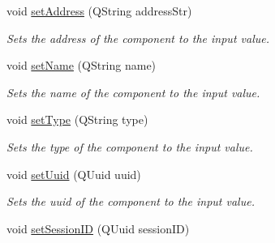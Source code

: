 \begin{DoxyCompactItemize}
\item 
\hypertarget{class_component_info_a73e97f046f6ec80a15ffad25293bd768}{void \hyperlink{class_component_info_a73e97f046f6ec80a15ffad25293bd768}{set\-Address} (Q\-String address\-Str)}\label{class_component_info_a73e97f046f6ec80a15ffad25293bd768}

\begin{DoxyCompactList}\small\item\em Sets the address of the component to the input value. \end{DoxyCompactList}\item 
\hypertarget{class_component_info_a94821c16533f7d2615d03a01164a7238}{void \hyperlink{class_component_info_a94821c16533f7d2615d03a01164a7238}{set\-Name} (Q\-String name)}\label{class_component_info_a94821c16533f7d2615d03a01164a7238}

\begin{DoxyCompactList}\small\item\em Sets the name of the component to the input value. \end{DoxyCompactList}\item 
\hypertarget{class_component_info_a22b8ce5e6bcae5a3c6b40ef9e89bbc62}{void \hyperlink{class_component_info_a22b8ce5e6bcae5a3c6b40ef9e89bbc62}{set\-Type} (Q\-String type)}\label{class_component_info_a22b8ce5e6bcae5a3c6b40ef9e89bbc62}

\begin{DoxyCompactList}\small\item\em Sets the type of the component to the input value. \end{DoxyCompactList}\item 
\hypertarget{class_component_info_a27ac89788d7034508b444d9f62d38ce5}{void \hyperlink{class_component_info_a27ac89788d7034508b444d9f62d38ce5}{set\-Uuid} (Q\-Uuid uuid)}\label{class_component_info_a27ac89788d7034508b444d9f62d38ce5}

\begin{DoxyCompactList}\small\item\em Sets the uuid of the component to the input value. \end{DoxyCompactList}\item 
\hypertarget{class_component_info_a9fb64b429325fef06d0b63ad8427c75e}{void \hyperlink{class_component_info_a9fb64b429325fef06d0b63ad8427c75e}{set\-Session\-I\-D} (Q\-Uuid session\-I\-D)}\label{class_component_info_a9fb64b429325fef06d0b63ad8427c75e}


\end{DoxyCompactItemize}
